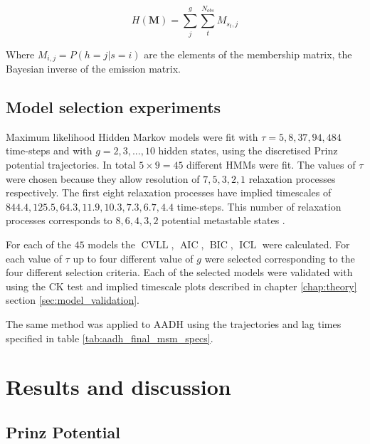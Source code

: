 \begin{equation}
    H(\mathbf{M}) = \sum_{j}^{g}\sum_{t}^{N_{obs}} M_{s_{t}, j}
\end{equation}

Where $M_{i,j} = P(h=j|s=i)$ are the elements of the membership matrix, the Bayesian inverse of the emission matrix.  

\subsection{Model selection experiments}
Maximum likelihood Hidden Markov models were fit with $\tau=5, 8, 37, 94, 484$ time-steps and with $g = 2, 3, ..., 10$ hidden states,  using the discretised Prinz potential trajectories. In total $5\times9=45$ different HMMs were fit. The values of $\tau$ were chosen because they allow resolution of $7, 5, 3, 2, 1$ relaxation processes respectively. The first eight relaxation processes have implied timescales of $844.4, 125.5,  64.3,  11.9,  10.3,   7.3,   6.7, 4.4$ time-steps. This number of relaxation processes corresponds to $8, 6, 4, 3, 2$ potential metastable states \cite{noeProjectedHiddenMarkov2013a}. 

For each of the $45$ models the $\operatorname{CVLL}$, $\operatorname{AIC}$, $\operatorname{BIC}$, $\operatorname{ICL}$ were calculated. For each value of $\tau$ up to four different value of $g$ were selected corresponding to the four different selection criteria. Each of the selected models were validated with using the CK test and implied timescale plots described in chapter \ref{chap:theory} section \ref{sec:model_validation}. 

The same method was applied to AADH using the trajectories and lag times specified in table \ref{tab:aadh_final_msm_specs}. 

\section{Results and discussion}\label{sec:hmm_results}
\subsection{Prinz Potential}

